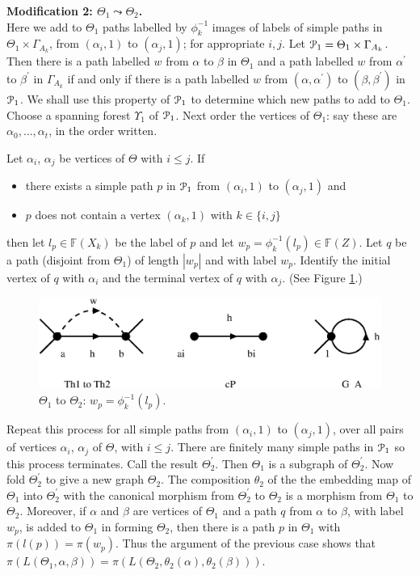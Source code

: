 \documentclass[a4paper,12pt]{article}
\renewcommand{\a}{\alpha }
\renewcommand{\b}{\beta }
\newcommand{\G}{\Gamma }
\newcommand{\T}{\Theta }
\newcommand{\U}{\Upsilon }
\newcommand{\cP}{{\cal{P}}}
\numberwithin{equation}{section}
\numberwithin{figure}{section}
\newcommand{\FF}{\ensuremath{\mathbb{F}}}
\begin{document}
\noindent\textbf{Modification 2: $\T_1\leadsto \T_2$.}\\
Here we add to $\T_1$ paths labelled by $\phi_k^{-1}$ images of labels of simple
paths in $\T_1\times \G_{A_k}$, from $(\a_i,1)$ to $(\a_j,1)$; for
appropriate $i,j$.
 Let $\cP_1=\T_1\times \G_{A_k}$. Then there is a path
 labelled $w$ from $\a$ to $\b$
in $\T_1$ and a path labelled $w$ from $\a^\prime $
to $\b^\prime$ in $\G_{A_k}$ if and only if there is a path
labelled $w$ from $(\a,\a^\prime)$ to $(\b,\b^\prime)$ in $\cP_1$.
 We shall
use this property of $\cP_1$ to determine which new paths to add  to
$\T_1$. Choose a spanning  forest $\U_1$ of  $\cP_1$. Next
 order the vertices of
$\T_1$: say these are $\a_0,\ldots, \a_t$, in the order written.

Let $\a_i$, $\a_j$ be vertices of  $\T$  with $i\le j$. If
\begin{itemize}
\item
 there
exists a simple path $p$ in $\cP_1$ from $(\a_i,1)$ to $(\a_j,1)$ and
\item
$p$ does not contain a vertex $(\a_k,1)$ with $k\in\{i,j\}$
\end{itemize}
then let $l_p\in \FF(X_k)$ be the label of $p$ and let
$w_p=\phi_k^{-1}(l_p)\in \FF(Z)$. Let $q$ be a path (disjoint from
$\T_1$) of length $|w_p|$ and with label $w_p$. Identify the
initial vertex of $q$ with $\a_i$ and the terminal vertex of $q$
with $\a_j$. (See Figure \ref{fig:alg2-2}.)
\begin{figure}
\begin{center}
\psfrag{a}{$\a$}
\psfrag{b}{$\b$}
\psfrag{ai}{$(\a_i,1)$}
\psfrag{bi}{$(\a_j,1)$}
\psfrag{Th1 to Th2}{$\T_1\leadsto \T_2$}
\psfrag{cP}{$\cP_1$}
\psfrag{G_A}{$\G_{A_k}$}
\includegraphics[scale=.5]{alg2-2.eps}
\end{center}
\caption{$\Theta_1$ to $\Theta_2$: $w_p=\phi_k^{-1}(l_p)$.}\label{fig:alg2-2}
\end{figure}
Repeat this process for all simple paths from  $(\a_i,1)$ to
$(\a_j,1)$, over all pairs of vertices $\a_i$, $\a_j$ of $\T$,
with $i\le j$. There are finitely many simple paths in $\cP_1$ so
this process terminates. Call the result $\T_2^\prime$. Then
$\T_1$ is a subgraph of $\T_2^\prime$. Now fold $\T_2^\prime$ to
give a new graph $\T_2$. The composition $\theta_2$ of the the
embedding map of $\T_1$ into $\T_2^\prime$ with the canonical
morphism from $\T_2^\prime$ to $\T_2$ is a morphism from $\T_1$ to
$\T_2$.
 Moreover, if $\a$ and
 $\b$ are
 vertices of $\T_1$ and
a path $q$ from $\a$ to $\b$, with label $w_p$, is added to $\Theta_1$
in forming $\Theta_2$, then there is a path $p$ in $\Theta_1$ with
$\pi(l(p))=\pi(w_p)$. Thus the argument of the previous case shows that
$\pi(L(\T_1,\a,\b))=\pi(L(\T_2,\theta_2(\a),\theta_2(\b)))$.\\[1em]
\end{document}

